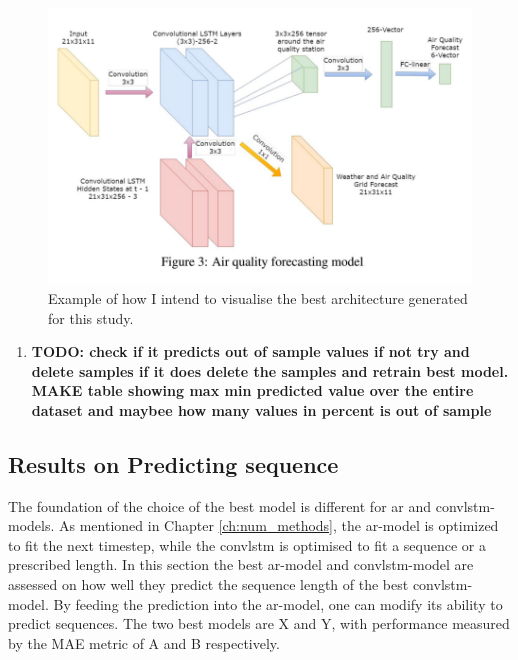 \begin{figure}
    \centering
    \includegraphics[scale=0.4]{python_figs/example_model.png}
    \caption{Example of how I intend to visualise the best architecture generated for this study.}
    \label{fig:best_ml_architecture}
\end{figure}

\begin{enumerate}
    \item \textbf{TODO: check if it predicts out of sample values if not try and delete samples if it does delete the samples and retrain best model. MAKE table showing max min predicted value over the entire dataset and maybee how many values in percent is out of sample}
\end{enumerate}


 
\subsection{Results on Predicting sequence}
The foundation of the choice of the best model is different for \acrshort{ar} and \acrshort{convlstm}-models. As mentioned in Chapter \ref{ch:num_methods}, the \acrshort{ar}-model is optimized to fit the next timestep, while the \acrshort{convlstm} is optimised to fit a sequence or a prescribed length. In this section the best \acrshort{ar}-model and \acrshort{convlstm}-model are assessed on how well they predict the sequence length of the best \acrshort{convlstm}-model. By feeding the prediction into the \acrshort{ar}-model, one can modify its ability to predict sequences. The two best models are X and Y, with performance measured by the MAE metric of A and B respectively. 

